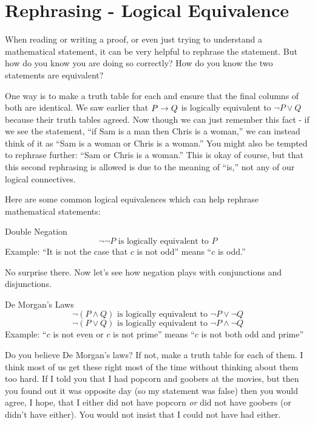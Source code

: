 \documentclass[12pt]{article}
\begin{document}
\section{Rephrasing - Logical Equivalence}

When reading or writing a proof, or even just trying to understand a mathematical statement, it can be very helpful to rephrase the statement.  But how do you know you are doing so correctly?  How do you know the two statements are equivalent?

One way is to make a truth table for each and ensure that the final columns of both are identical.  
We saw earlier that $P \rightarrow Q$ is logically equivalent to $\neg P \vee Q$ because their truth tables agreed.  Now though we can just remember this fact - if we see the statement, ``if Sam is a man then Chris is a woman,'' we can instead think of it as ``Sam is a woman or Chris is a woman.''  You might also be tempted to rephrase further: ``Sam or Chris is a woman.''  This is okay of course, but that this second rephrasing is allowed is due to the meaning of ``is,'' not any of our logical connectives.  

Here are some common logical equivalences which can help rephrase mathematical statements:

\begin{defbox}{Double Negation}
  \[\neg \neg P \mbox{ is logically equivalent to } P\]
  Example: ``It is not the case that $c$ is not odd'' means ``$c$ is odd.''
\end{defbox}

No surprise there.  Now let's see how negation plays with conjunctions and disjunctions.

\begin{defbox}{De Morgan's Laws}
  \[\neg(P \wedge Q) \mbox{ is logically equivalent to } \neg P \vee \neg Q\]
  \[\neg(P \vee Q) \mbox{ is logically equivalent to } \neg P \wedge \neg Q\]
  Example: ``$c$ is not even or $c$ is not prime'' means ``$c$ is not both odd and prime''
\end{defbox}

Do you believe De Morgan's laws?  If not, make a truth table for each of them.  I think most of us get these right most of the time without thinking about them too hard.  If I told you that I had popcorn and goobers at the movies, but then you found out it was opposite day (so my statement was false) then you would agree, I hope, that I either did not have popcorn {\em or} did not have goobers (or didn't have either).  You would not insist that I could not have had either.
\end{document}
